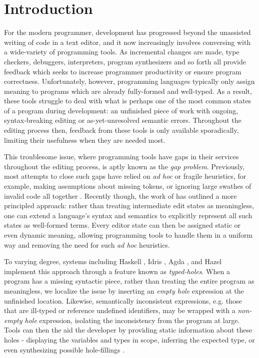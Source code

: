 \section{Introduction}\label{sec:intro}

For the modern programmer, development has progressed beyond the unassisted writing of code in a text editor, and it now increasingly involves conversing with a wide-variety of programming tools. As incremental changes are made, type checkers, debuggers, interpreters, program synthesizers and so forth all provide feedback which seeks to increase programmer productivity or ensure program correctness. Unfortunately, however, programming languages typically only assign meaning to programs which are already fully-formed and well-typed. As a result, these tools struggle to deal with what is perhaps one of the most common states of a program during development: an unfinished piece of work with ongoing, syntax-breaking editing or as-yet-unresolved semantic errors. Throughout the editing process then, feedback from these tools is only available sporadically, limiting their usefulness when they are needed most.

This troublesome issue, where programming tools have gaps in their services throughout the editing process, is aptly known as the \emph{gap problem}. Previously, most attempts to close such gaps have relied on \textit{ad hoc} or fragile heuristics, for example, making assumptions about missing tokens, or ignoring large swathes of invalid code all together \cite{DBLP:conf/oopsla/KatsJNV09, DBLP:conf/snapl/OmarVHSGAH17}. Recently though, the work of  \cite{DBLP:conf/snapl/OmarVHSGAH17} has outlined a more principled approach: rather than treating intermediate edit states as meaningless, one can extend a language's syntax and semantics to explicitly represent all such states as well-formed terms. Every editor state can then be assigned static or even dynamic meaning, allowing programming tools to handle them in a uniform way and removing the need for such \emph{ad hoc} heuristics.

To varying degree, systems including Haskell \cite{GHCHoles}, Idris \cite{DBLP:journals/jfp/Brady13}, Agda \cite{DBLP:conf/icfp/Norell13}, and Hazel \cite{DBLP:conf/popl/OmarVHAH17} implement this approach through a feature known as \emph{typed-holes}. When a program has a missing syntactic piece, rather than treating the entire program as meaningless, we localize the issue by inserting an \emph{empty hole} expression at the unfinished location. Likewise, semantically inconsistent expressions, e.g. those that are ill-typed or reference undefined identifiers, may be wrapped with a \emph{non-empty hole} expression, isolating the inconsistency from the program at large. Tools can then the aid the developer by providing static information about these holes - displaying the variables and types in scope, inferring the expected type, or even synthesizing possible hole-fillings \cite{DBLP:conf/haskell/Gissurarson18, DBLP:journals/pacmpl/LubinCOC20}. 

